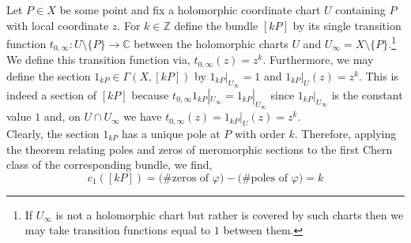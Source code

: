 \documentclass[12pt]{extarticle}
\newcommand{\Z}{\mathbb{Z}}
\newcommand{\C}{\mathbb{C}}
\theoremstyle{definition}
\begin{document}
Let $P \in X$ be some point and fix a holomorphic coordinate chart $U$ containing $P$ with local coordinate $z$. For $k \in \Z$ define the bundle $[k P]$ by its single transition function $t_{0, \infty} : U \setminus \{P\} \to \C$ between the holomorphic charts $U$ and $U_{\infty} = X \setminus \{P\}$.\footnote{If $U_{\infty}$ is not a holomorphic chart but rather is covered by such charts then we may take transition functions equal to $1$ between them. } We define this transition function via, $t_{0,\infty}(z) = z^k$. Furthermore, we may define the section $1_{kP} \in \Gamma(X, [kP])$ by $1_{kP} |_{U_{\infty}} = 1$ and $1_{kP} |_{U}(z) = z^k$. This is indeed a section of $[kP]$ because $t_{0, \infty} 1_{kP}|_{U_{\infty}} = 1_{kP} |_{U_{\infty}}$ since $1_{kP}|_{U_{\infty}}$ is the constant value $1$ and, on $U \cap U_{\infty}$ we have $t_{0, \infty}(z) = 1_{kP} |_{U}(z) = z^k$. 
\bigskip\\
Clearly, the section $1_{kP}$ has a unique pole at $P$ with order $k$. Therefore, applying the theorem relating poles and zeros of meromorphic sections to the first Chern class of the corresponding bundle, we find,
\[ c_1([kP]) = \text{(\# zeros of $\varphi$)} - \text{(\# poles of $\varphi$)} = k \]
\end{document}
